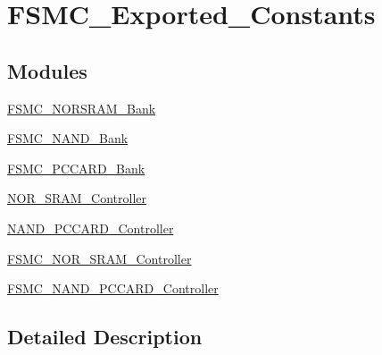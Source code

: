 \hypertarget{group___f_s_m_c___exported___constants}{\section{F\-S\-M\-C\-\_\-\-Exported\-\_\-\-Constants}
\label{group___f_s_m_c___exported___constants}
}
\subsection*{Modules}
\begin{DoxyCompactItemize}
\item 
\hyperlink{group___f_s_m_c___n_o_r_s_r_a_m___bank}{F\-S\-M\-C\-\_\-\-N\-O\-R\-S\-R\-A\-M\-\_\-\-Bank}
\item 
\hyperlink{group___f_s_m_c___n_a_n_d___bank}{F\-S\-M\-C\-\_\-\-N\-A\-N\-D\-\_\-\-Bank}
\item 
\hyperlink{group___f_s_m_c___p_c_c_a_r_d___bank}{F\-S\-M\-C\-\_\-\-P\-C\-C\-A\-R\-D\-\_\-\-Bank}
\item 
\hyperlink{group___n_o_r___s_r_a_m___controller}{N\-O\-R\-\_\-\-S\-R\-A\-M\-\_\-\-Controller}
\item 
\hyperlink{group___n_a_n_d___p_c_c_a_r_d___controller}{N\-A\-N\-D\-\_\-\-P\-C\-C\-A\-R\-D\-\_\-\-Controller}
\item 
\hyperlink{group___f_s_m_c___n_o_r___s_r_a_m___controller}{F\-S\-M\-C\-\_\-\-N\-O\-R\-\_\-\-S\-R\-A\-M\-\_\-\-Controller}
\item 
\hyperlink{group___f_s_m_c___n_a_n_d___p_c_c_a_r_d___controller}{F\-S\-M\-C\-\_\-\-N\-A\-N\-D\-\_\-\-P\-C\-C\-A\-R\-D\-\_\-\-Controller}
\end{DoxyCompactItemize}


\subsection{Detailed Description}

